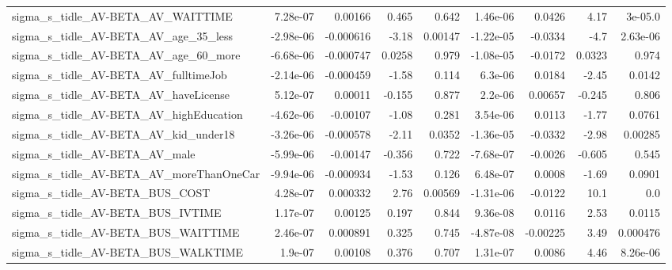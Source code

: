 \begin{tabular}{lrrrrrrrr}
sigma\_s\_tidle\_AV-BETA\_AV\_WAITTIME                  &    7.28e-07 &      0.00166 &    0.465 &    0.642 &   1.46e-06 &      0.0426 &         4.17 &       3e-05.0 \\
sigma\_s\_tidle\_AV-BETA\_AV\_age\_35\_less               &   -2.98e-06 &    -0.000616 &    -3.18 &  0.00147 &  -1.22e-05 &     -0.0334 &         -4.7 &      2.63e-06 \\
sigma\_s\_tidle\_AV-BETA\_AV\_age\_60\_more               &   -6.68e-06 &    -0.000747 &   0.0258 &    0.979 &  -1.08e-05 &     -0.0172 &       0.0323 &         0.974 \\
sigma\_s\_tidle\_AV-BETA\_AV\_fulltimeJob               &   -2.14e-06 &    -0.000459 &    -1.58 &    0.114 &    6.3e-06 &      0.0184 &        -2.45 &        0.0142 \\
sigma\_s\_tidle\_AV-BETA\_AV\_haveLicense               &    5.12e-07 &      0.00011 &   -0.155 &    0.877 &    2.2e-06 &     0.00657 &       -0.245 &         0.806 \\
sigma\_s\_tidle\_AV-BETA\_AV\_highEducation             &   -4.62e-06 &     -0.00107 &    -1.08 &    0.281 &   3.54e-06 &      0.0113 &        -1.77 &        0.0761 \\
sigma\_s\_tidle\_AV-BETA\_AV\_kid\_under18               &   -3.26e-06 &    -0.000578 &    -2.11 &   0.0352 &  -1.36e-05 &     -0.0332 &        -2.98 &       0.00285 \\
sigma\_s\_tidle\_AV-BETA\_AV\_male                      &   -5.99e-06 &     -0.00147 &   -0.356 &    0.722 &  -7.68e-07 &     -0.0026 &       -0.605 &         0.545 \\
sigma\_s\_tidle\_AV-BETA\_AV\_moreThanOneCar            &   -9.94e-06 &    -0.000934 &    -1.53 &    0.126 &   6.48e-07 &      0.0008 &        -1.69 &        0.0901 \\
sigma\_s\_tidle\_AV-BETA\_BUS\_COST                     &    4.28e-07 &     0.000332 &     2.76 &  0.00569 &  -1.31e-06 &     -0.0122 &         10.1 &           0.0 \\
sigma\_s\_tidle\_AV-BETA\_BUS\_IVTIME                   &    1.17e-07 &      0.00125 &    0.197 &    0.844 &   9.36e-08 &      0.0116 &         2.53 &        0.0115 \\
sigma\_s\_tidle\_AV-BETA\_BUS\_WAITTIME                 &    2.46e-07 &     0.000891 &    0.325 &    0.745 &  -4.87e-08 &    -0.00225 &         3.49 &      0.000476 \\
sigma\_s\_tidle\_AV-BETA\_BUS\_WALKTIME                 &     1.9e-07 &      0.00108 &    0.376 &    0.707 &   1.31e-07 &      0.0086 &         4.46 &      8.26e-06 \\

\end{tabular}
